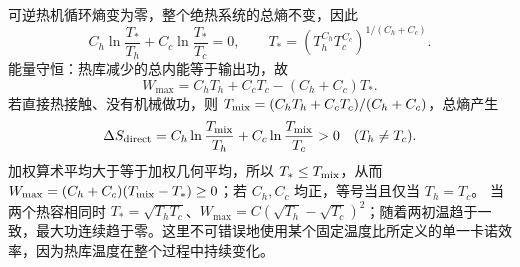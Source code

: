 可逆热机循环熵变为零，整个绝热系统的总熵不变，因此
\[C_h\ln\frac{T_*}{T_h}+C_c\ln\frac{T_*}{T_c}=0,\qquad
T_*=\left(T_h^{C_h}T_c^{C_c}\right)^{1/(C_h+C_c)}.\]
能量守恒：热库减少的总内能等于输出功，故
\[W_{\max}=C_hT_h+C_cT_c-(C_h+C_c)T_*.\]
若直接热接触、没有机械做功，则 \(T_{\rm mix}=(C_hT_h+C_cT_c)/(C_h+C_c)\)，总熵产生
\[\Delta S_{\rm direct}=C_h\ln\frac{T_{\rm mix}}{T_h}+C_c\ln\frac{T_{\rm mix}}{T_c}>0\quad(T_h\ne T_c).\]
加权算术平均大于等于加权几何平均，所以 \(T_*\le T_{\rm mix}\)，从而 \(W_{\max}=(C_h+C_c)(T_{\rm mix}-T_*)\ge0\)；若 \(C_h,C_c\) 均正，等号当且仅当 \(T_h=T_c\)。
当两个热容相同时 \(T_*=\sqrt{T_hT_c}\)、\(W_{\max}=C(\sqrt{T_h}-\sqrt{T_c})^2\)；随着两初温趋于一致，最大功连续趋于零。这里不可错误地使用某个固定温度比所定义的单一卡诺效率，因为热库温度在整个过程中持续变化。
